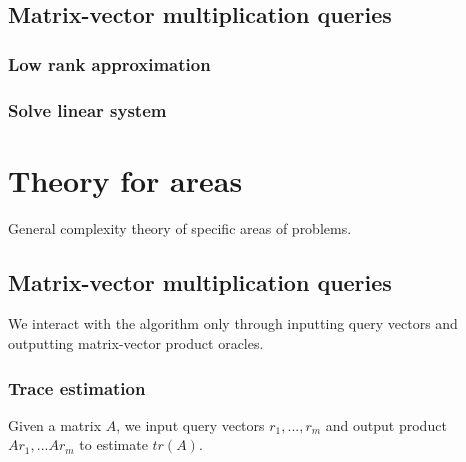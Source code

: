 \documentclass[10pt]{book}
\begin{document}
\section{Matrix-vector multiplication queries}
\subsection{Low rank approximation}
\cite{bakshi2022lowrank}



\subsection{Solve linear system}
\cite{braverman2021gradient}


\chapter{Theory for areas}
General complexity theory of specific areas of problems. 

\section{Matrix-vector multiplication queries}
We interact with the algorithm only through inputting query vectors and outputting matrix-vector product oracles. 

\subsection{Trace estimation}
\begin{prob}
\label{tr_est}
Given a matrix $A$, we input query vectors $r_1,...,r_m$ and output product $Ar_1,...Ar_m$ to estimate $tr(A)$. 
\end{prob}
\end{document}
